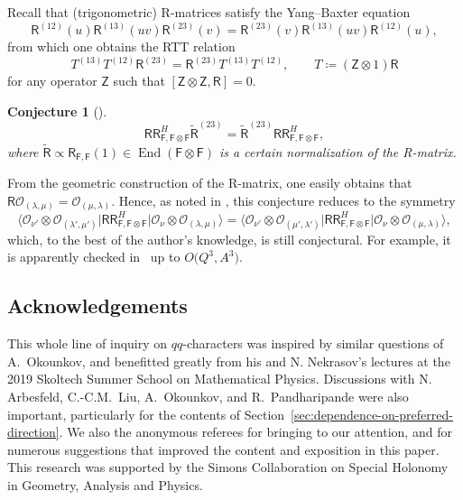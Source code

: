 \documentclass[pdftex]{sigma}%
\numberwithin{equation}{section}
\newtheorem{Conjecture}[Theorem]{Conjecture}
 { \theoremstyle{definition}
\newtheorem{Definition}[Theorem]{Definition}
\newtheorem{Example}[Theorem]{Example}
\newtheorem{Remark}[Theorem]{Remark}
\newtheorem{MyParagraph}{}[subsection]
}
\renewcommand{\tilde}[1]{\widetilde{#1}}
\newcommand{\cO}{\mathcal{O}}
\newcommand{\sF}{\mathsf{F}}
\newcommand{\sZ}{\mathsf{Z}}
\newcommand{\sR}{\mathsf{R}}
\newcommand{\sRR}{\mathsf{RR}}
\DeclareMathOperator{\End}{End}
\begin{document}
\begin{MyParagraph}\label{sec:RR-matrix-YBE}
Recall that (trigonometric) R-matrices satisfy the Yang--Baxter
equation
\[ \sR^{(12)}(u) \sR^{(13)}(uv) \sR^{(23)}(v) = \sR^{(23)}(v) \sR^{(13)}(uv) \sR^{(12)}(u), \]
from which one obtains the RTT relation
\[ T^{(13)} T^{(12)} \sR^{(23)} = \sR^{(23)} T^{(13)} T^{(12)}, \qquad T \coloneqq (\sZ \otimes 1)\sR \]
for any operator $\sZ$ such that $[\sZ \otimes \sZ, \sR] = 0$.

\begin{Conjecture}[{\cite[Section~3]{Awata2016}}]
 \[ \sRR^H_{\sF,\sF \otimes \sF} \tilde \sR^{(23)} = \tilde \sR^{(23)} \sRR^H_{\sF,\sF \otimes \sF}, \]
 where
 $\tilde \sR \propto \sR_{\sF,\sF}(1) \in \End(\sF \otimes \sF)$ is a
 certain normalization of the R-matrix.
\end{Conjecture}

From the geometric construction of the R-matrix, one easily obtains
that $\sR \cO_{(\lambda,\mu)} = \cO_{(\mu,\lambda)}$. Hence, as noted
in \cite{Awata2016}, this conjecture reduces to the symmetry
\begin{equation*}
 \big\langle \cO_{\nu'} \otimes \cO_{(\lambda',\mu')} \big| \sRR^H_{\sF,\sF \otimes \sF} \big| \cO_{\nu} \otimes \cO_{(\lambda,\mu)}\big\rangle = \big\langle\cO_{\nu'} \otimes \cO_{(\mu',\lambda')} \big| \sRR^H_{\sF,\sF \otimes \sF} \big| \cO_{\nu} \otimes \cO_{(\mu,\lambda)}\big\rangle,
\end{equation*}
which, to the best of the author's knowledge, is still conjectural.
For example, it is apparently checked in~\cite{Morozov2016} up to
$O\big(Q^3,A^3\big)$.
\end{MyParagraph}

\subsection*{Acknowledgements}

This whole line of inquiry on $qq$-characters was inspired by similar
questions of A.~Okounkov, and benefitted greatly from his and N.
Nekrasov's lectures at the 2019 Skoltech Summer School on Mathematical
Physics. Discussions with N. Arbesfeld, C.-C.M.~Liu, A.~Okounkov, and
R.~Pandharipande were also important, particularly for the contents of
Section~\ref{sec:dependence-on-preferred-direction}. We also the anonymous
referees for bringing \cite{Fukuda2020} to our attention, and for
numerous suggestions that improved the content and exposition in this
paper.
This research was supported by the Simons Collaboration on Special
Holonomy in Geometry, Analysis and Physics.
\end{document}
